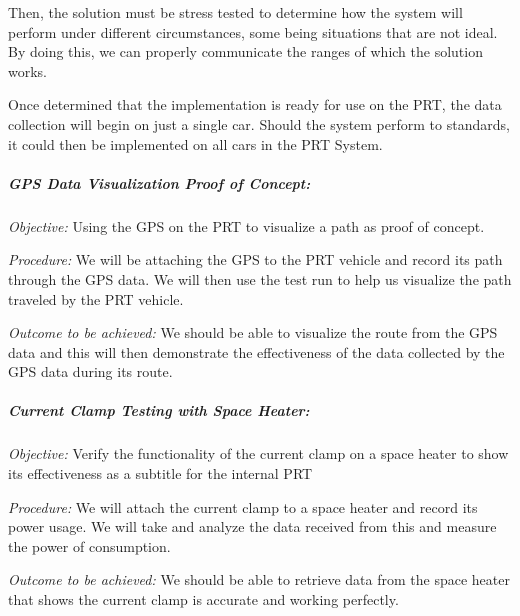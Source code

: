 Then, the solution must be stress tested to determine how the system will perform under different circumstances, some being situations that are not ideal. 
By doing this, we can properly communicate the ranges of which the solution works.

Once determined that the implementation is ready for use on the PRT, the data collection will begin on just a single car. 
Should the system perform to standards, it could then be implemented on all cars in the PRT System.

\subparagraph{GPS Data Visualization Proof of Concept:}
\textit{Objective:} Using the GPS on the PRT to visualize a path as proof of concept.

\textit{Procedure:} We will be attaching the GPS to the PRT vehicle and record its path through the GPS data. We will then use the test run to help us visualize the path traveled by the PRT vehicle.

\textit{Outcome to be achieved:} We should be able to visualize the route from the GPS data and this will then demonstrate the effectiveness of the data collected by the GPS data during its route.

\subparagraph{Current Clamp Testing with Space Heater:}
\textit{Objective:} Verify the functionality of the current clamp on a space heater to show its effectiveness as a subtitle for the internal PRT

\textit{Procedure:} We will attach the current clamp to a space heater and record its power usage. We will take and analyze the data received from this and measure the power of consumption.

\textit{Outcome to be achieved:} We should be able to retrieve data from the space heater that shows the current clamp is accurate and working perfectly.
